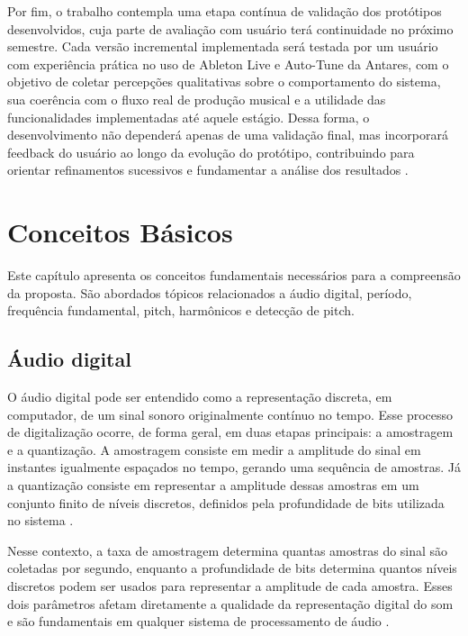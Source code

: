 Por fim, o trabalho contempla uma etapa contínua de validação dos protótipos desenvolvidos, cuja parte de avaliação com usuário terá continuidade no próximo semestre. Cada versão incremental implementada será testada por um usuário com experiência prática no uso de Ableton Live e Auto-Tune da Antares, com o objetivo de coletar percepções qualitativas sobre o comportamento do sistema, sua coerência com o fluxo real de produção musical e a utilidade das funcionalidades implementadas até aquele estágio. Dessa forma, o desenvolvimento não dependerá apenas de uma validação final, mas incorporará feedback do usuário ao longo da evolução do protótipo, contribuindo para orientar refinamentos sucessivos e fundamentar a análise dos resultados \cite{antares_autotune_pro,ableton_live}.

\chapter{\label{chap:conceitos_basicos}Conceitos Básicos}

Este capítulo apresenta os conceitos fundamentais necessários para a compreensão da proposta. São abordados tópicos relacionados a áudio digital, período, frequência fundamental, pitch, harmônicos e detecção de pitch.

\section{Áudio digital}

O áudio digital pode ser entendido como a representação discreta, em computador, de um sinal sonoro originalmente contínuo no tempo. Esse processo de digitalização ocorre, de forma geral, em duas etapas principais: a amostragem e a quantização. A amostragem consiste em medir a amplitude do sinal em instantes igualmente espaçados no tempo, gerando uma sequência de amostras. Já a quantização consiste em representar a amplitude dessas amostras em um conjunto finito de níveis discretos, definidos pela profundidade de bits utilizada no sistema \cite{digitalsound_digitization}.

Nesse contexto, a taxa de amostragem determina quantas amostras do sinal são coletadas por segundo, enquanto a profundidade de bits determina quantos níveis discretos podem ser usados para representar a amplitude de cada amostra. Esses dois parâmetros afetam diretamente a qualidade da representação digital do som e são fundamentais em qualquer sistema de processamento de áudio \cite{digitalsound_digitization}.

